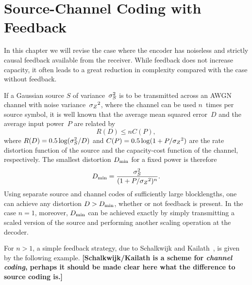 \chapter{Source-Channel Coding with Feedback}
\label{ch:feedback}

In this chapter we will revise the case where the encoder has noiseless and
strictly causal feedback available from the receiver. While feedback does not
increase capacity, it often leads to a great reduction in complexity compared
with the case without feedback. 

If a Gaussian source $S$ of variance~${\sigma_S^2}$ is to be transmitted across an AWGN
channel with noise variance~${{\sigma_Z}^2}$, where the channel can be used $n$~times per
source symbol, it is well known that the average mean squared error~$D$ and the
average input power~$P$ are related by
\begin{equation}
  \label{eq:shannonlimit1}
  R(D) \le nC(P),
\end{equation}
where $R(D) = 0.5 \log({\sigma_S^2}/D)$ and $C(P) = 0.5\log(1+P/{{\sigma_Z}^2})$ are the rate
distortion function of the source and the capacity-cost function of the channel,
respectively. The smallest distortion $D_{\min}$ for a fixed power is therefore
\begin{equation}
  \label{eq:mindist}
  D_{\min} = \frac{{\sigma_S^2}}{(1 + P/{{\sigma_Z}^2})^n}.
\end{equation}
Using separate source and channel codes of sufficiently large blocklengths, one
can achieve any distortion $D > D_{\min}$, whether or not feedback is present.
In the case $n=1$, moreover, $D_{\min}$ can be achieved exactly by simply
transmitting a scaled version of the source and performing another scaling
operation at the decoder. 

For $n > 1$, a simple feedback strategy, due to Schalkwijk and
Kailath~\cite{SchalkwijkK1966}, is given by the following example.
\textbf{[Schalkwijk\slash Kailath is a scheme for \emph{channel coding}, perhaps
it should be made clear here what the difference to source coding is.]}

